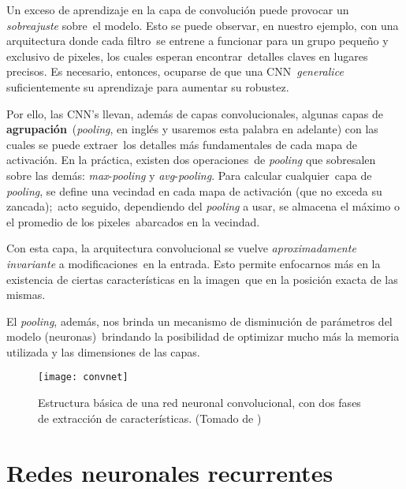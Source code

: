 \noindent
Un exceso de aprendizaje en la capa de convolución puede provocar un \emph{sobreajuste} sobre\
el modelo. Esto se puede observar, en nuestro ejemplo, con una arquitectura donde cada filtro\
se entrene a funcionar para un grupo pequeño y exclusivo de pixeles, los cuales esperan encontrar\
detalles claves en lugares precisos. Es necesario, entonces, ocuparse de que una CNN\
\emph{generalice} suficientemente su aprendizaje para aumentar su robustez.\par
Por ello, las CNN's llevan, además de capas convolucionales, algunas capas de \textbf{agrupación}\
(\emph{pooling}, en inglés y usaremos esta palabra en adelante) con las cuales se puede extraer\
los detalles más fundamentales de cada mapa de activación. En la práctica, existen dos operaciones\
de \emph{pooling} que sobresalen sobre las demás: \emph{max}-\emph{pooling} y \emph{avg}-\emph{pooling}. Para calcular cualquier\
capa de \emph{pooling}, se define una vecindad en cada mapa de activación (que no exceda su zancada);\
acto seguido, dependiendo del \emph{pooling} a usar, se almacena el máximo o el promedio de los pixeles\
abarcados en la vecindad.\par
Con esta capa, la arquitectura convolucional se vuelve \textit{aproximadamente \emph{invariante}} a modificaciones\
en la entrada. Esto permite enfocarnos más en la existencia de ciertas características en la imagen\
que en la posición exacta de las mismas.\par
El \emph{pooling}, además, nos brinda un mecanismo de disminución de parámetros del modelo (neuronas)\
brindando la posibilidad de optimizar mucho más la memoria utilizada y las dimensiones de las capas.

\begin{figure}
  \centering
  \texttt{[image: convnet]}
  \caption{Estructura básica de una red neuronal convolucional, con dos fases de extracción de características.
    (Tomado de \cite{lecun2010})}
  \label{convnet_fig}
\end{figure}


\section{Redes neuronales recurrentes}


